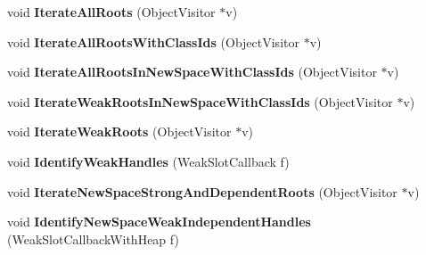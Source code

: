 \begin{DoxyCompactItemize}
\item 
void {\bfseries Iterate\+All\+Roots} (Object\+Visitor $\ast$v)\hypertarget{classv8_1_1internal_1_1_global_handles_a1e2bee589562848cc6612b8764946ae6}{}\label{classv8_1_1internal_1_1_global_handles_a1e2bee589562848cc6612b8764946ae6}

\item 
void {\bfseries Iterate\+All\+Roots\+With\+Class\+Ids} (Object\+Visitor $\ast$v)\hypertarget{classv8_1_1internal_1_1_global_handles_a6fd1a5b22e2bcd0ecb38b1472edc396b}{}\label{classv8_1_1internal_1_1_global_handles_a6fd1a5b22e2bcd0ecb38b1472edc396b}

\item 
void {\bfseries Iterate\+All\+Roots\+In\+New\+Space\+With\+Class\+Ids} (Object\+Visitor $\ast$v)\hypertarget{classv8_1_1internal_1_1_global_handles_a1d32005a16121ad732832c0e5fb04829}{}\label{classv8_1_1internal_1_1_global_handles_a1d32005a16121ad732832c0e5fb04829}

\item 
void {\bfseries Iterate\+Weak\+Roots\+In\+New\+Space\+With\+Class\+Ids} (Object\+Visitor $\ast$v)\hypertarget{classv8_1_1internal_1_1_global_handles_a28ddfad93691c0bcf8d07fa02f6b7027}{}\label{classv8_1_1internal_1_1_global_handles_a28ddfad93691c0bcf8d07fa02f6b7027}

\item 
void {\bfseries Iterate\+Weak\+Roots} (Object\+Visitor $\ast$v)\hypertarget{classv8_1_1internal_1_1_global_handles_af7c5a6ae9af4f86ddd3288c000a447c9}{}\label{classv8_1_1internal_1_1_global_handles_af7c5a6ae9af4f86ddd3288c000a447c9}

\item 
void {\bfseries Identify\+Weak\+Handles} (Weak\+Slot\+Callback f)\hypertarget{classv8_1_1internal_1_1_global_handles_ac3fff0215793e5709141755b9195a38c}{}\label{classv8_1_1internal_1_1_global_handles_ac3fff0215793e5709141755b9195a38c}

\item 
void {\bfseries Iterate\+New\+Space\+Strong\+And\+Dependent\+Roots} (Object\+Visitor $\ast$v)\hypertarget{classv8_1_1internal_1_1_global_handles_a561e082207845938b4c552ac48e6e5f1}{}\label{classv8_1_1internal_1_1_global_handles_a561e082207845938b4c552ac48e6e5f1}

\item 
void {\bfseries Identify\+New\+Space\+Weak\+Independent\+Handles} (Weak\+Slot\+Callback\+With\+Heap f)\hypertarget{classv8_1_1internal_1_1_global_handles_a863e33bb5a55dafda78a486babb6b69c}{}\label{classv8_1_1internal_1_1_global_handles_a863e33bb5a55dafda78a486babb6b69c}


\end{DoxyCompactItemize}
